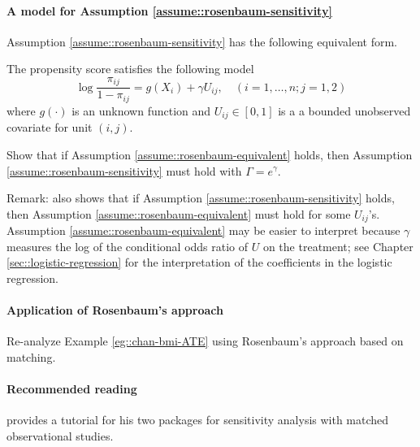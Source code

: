 \paragraph{A model for Assumption \ref{assume::rosenbaum-sensitivity}}\label{hw::rosenbaum-equivalent}

Assumption \ref{assume::rosenbaum-sensitivity} has the following equivalent form. 


\begin{assumption}
\label{assume::rosenbaum-equivalent}
The propensity score satisfies the following model
$$
\log \frac{  \pi_{ij} }{  1-\pi_{ij}  } = g(X_i) + \gamma U_{ij} ,\quad (i=1,\ldots, n; j=1,2)
$$
where $g(\cdot)$ is an unknown function and $U_{ij} \in [0, 1]$ is a a bounded unobserved covariate for unit $(i, j)$. 
\end{assumption}


Show that if Assumption \ref{assume::rosenbaum-equivalent} holds, then Assumption \ref{assume::rosenbaum-sensitivity} must hold with $\Gamma = e^\gamma$. 


Remark: \citet[][page 108]{rosenbaum2002design} also shows that if Assumption \ref{assume::rosenbaum-sensitivity} holds, then Assumption \ref{assume::rosenbaum-equivalent} must hold for some $U_{ij}$'s. Assumption \ref{assume::rosenbaum-equivalent} may be easier to interpret because $\gamma$ measures the log of the conditional odds ratio of $U$ on the treatment; see Chapter \ref{sec::logistic-regression} for the interpretation of the coefficients in the logistic regression. 



\paragraph{Application of Rosenbaum's approach}
Re-analyze Example \ref{eg::chan-bmi-ATE} using Rosenbaum's approach based on matching.



\paragraph{Recommended reading}


\citet{rosenbaum2015two} provides a tutorial for his two  packages for sensitivity analysis with matched observational studies. 

